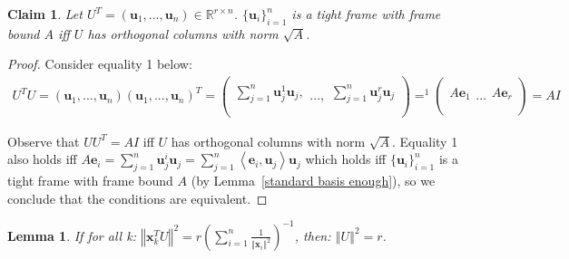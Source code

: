 \documentclass{article}
\newtheorem{lemma}[theorem]{Lemma}
\newtheorem{claim}{Claim}
\newcommand{\Lemmaref}[1]{Lemma~\ref{#1}}
\newcommand{\x}{{\mathbf x}}
\renewcommand{\u}{{\mathbf u}}
\newcommand{\e}{{\mathbf e}}
\newcommand{\norm}[1]{\left\Vert #1\right\Vert}
\begin{document}
\begin{claim} \label{tight frame iff scaled orthonormal}
Let $U^T=(\u_1,...,\u_n)\in\mathbb{R}^{r\times n}$. $\{\u_i\}_{i=1}^n$ is a tight frame with frame bound $A$ iff $U$ has orthogonal columns with norm $\sqrt{A}$. 
\end{claim}

\begin{proof}


Consider equality 1 below: 
\begin{align*}
    U^{T}U=\left(\u_{1},...,\u_{n}\right)\left(\u_{1},...,\u_{n}\right)^{T}=\left(\begin{array}{c}
    \\
    \sum_{j=1}^{n}\u_{j}^{1}\u_{j},\\
    \\
    \end{array}...,\begin{array}{c}
    \\
    \sum_{j=1}^{n}\u_{j}^{r}\u_{j}\\
    \\
    \end{array}\right)=^1\left(\begin{array}{c}
    \\
    A\e_{1}\\
    \\
    \end{array}...\begin{array}{c}
    \\
    A\e_{r}\\
    \\
    \end{array}\right)=AI
\end{align*}

Observe that $UU^T=AI$ iff $U$ has orthogonal columns with norm $\sqrt A$. Equality 1 also holds iff $A\e_{i}=\sum_{j=1}^{n}\u_{j}^{i}\u_{j}=\sum_{j=1}^{n}\left\langle \e_{i},\u_{j}\right\rangle \u_{j}$ which holds iff $\{\u_i\}_{i=1}^n$ is a tight frame with frame bound $A$ (by \Lemmaref{standard basis enough}), so we conclude that the conditions are equivalent.
\end{proof}

\begin{lemma} \label{sum is r}
 If for all k: $\left\Vert \x_k^TU\right\Vert^2=r\left({\sum_{i=1}^n \frac{1}{\left\Vert \x_{i}\right\Vert^{2}}}\right)^{-1}$, then: $\norm{U}^2=r$.
\end{lemma}
\end{document}
